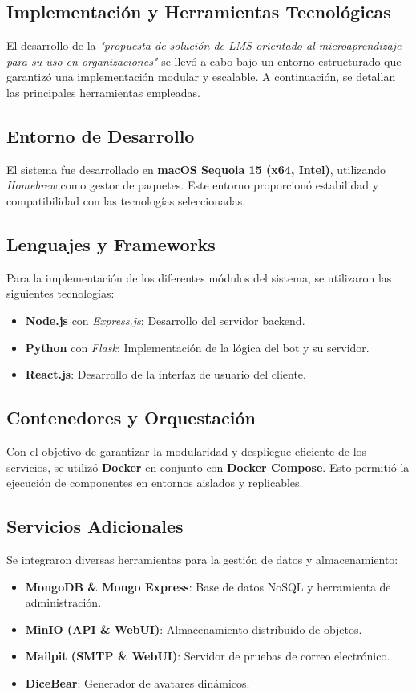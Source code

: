 \subsection{Implementación y Herramientas Tecnológicas}

El desarrollo de  la \textit{"propuesta de solución de LMS orientado al
microaprendizaje para su uso en organizaciones"} se llevó a cabo bajo un entorno
estructurado que garantizó una implementación modular y escalable. A
continuación, se detallan las principales herramientas empleadas.

\subsection{Entorno de Desarrollo}
El sistema fue desarrollado en \textbf{macOS Sequoia 15 (x64, Intel)},
utilizando \textit{Homebrew} como gestor de paquetes. Este entorno proporcionó
estabilidad y compatibilidad con las tecnologías seleccionadas.

\subsection{Lenguajes y Frameworks}
Para la implementación de los diferentes módulos del sistema, se utilizaron las
siguientes tecnologías:
\begin{itemize}
	\item \textbf{Node.js} con \textit{Express.js}: Desarrollo del servidor
	backend.
	\item \textbf{Python} con \textit{Flask}: Implementación de la lógica del
	bot y su servidor.
	\item \textbf{React.js}: Desarrollo de la interfaz de usuario del cliente.
\end{itemize}

\subsection{Contenedores y Orquestación}
Con el objetivo de garantizar la modularidad y despliegue eficiente de los
servicios, se utilizó \textbf{Docker} en conjunto con \textbf{Docker Compose}.
Esto permitió la ejecución de componentes en entornos aislados y replicables.

\subsection{Servicios Adicionales}
Se integraron diversas herramientas para la gestión de datos y almacenamiento:
\begin{itemize}
	\item \textbf{MongoDB \& Mongo Express}: Base de datos NoSQL y herramienta
	de administración.
	\item \textbf{MinIO (API \& WebUI)}: Almacenamiento distribuido de objetos.
	\item \textbf{Mailpit (SMTP \& WebUI)}: Servidor de pruebas de correo
	electrónico.
	\item \textbf{DiceBear}: Generador de avatares dinámicos.
\end{itemize}

